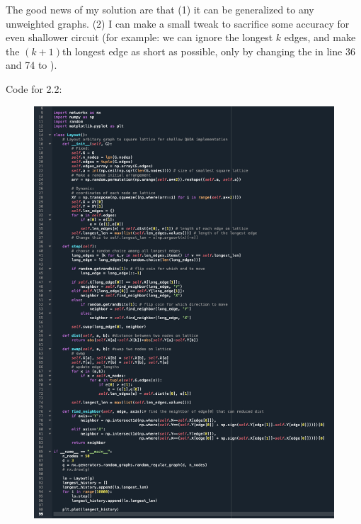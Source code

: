 \documentclass{article}
\begin{document}
\begin{figure}[h]
    \centering
    \qquad
\end{figure}
The good news of my solution are that (1) it can be generalized to any unweighted graphs. (2) I can make a small tweak to sacrifice some accuracy for even shallower circuit (for example: we can ignore the longest $k$ edges, and make the $(k+1)$th longest edge as short as possible, only by changing the  in line 36 and 74 to ).

\newpage
Code for 2.2:
\begin{figure}[h]
    \centering
    \includegraphics[width=0.87\linewidth]{figt2-4.png}
\end{figure}
\end{document}
